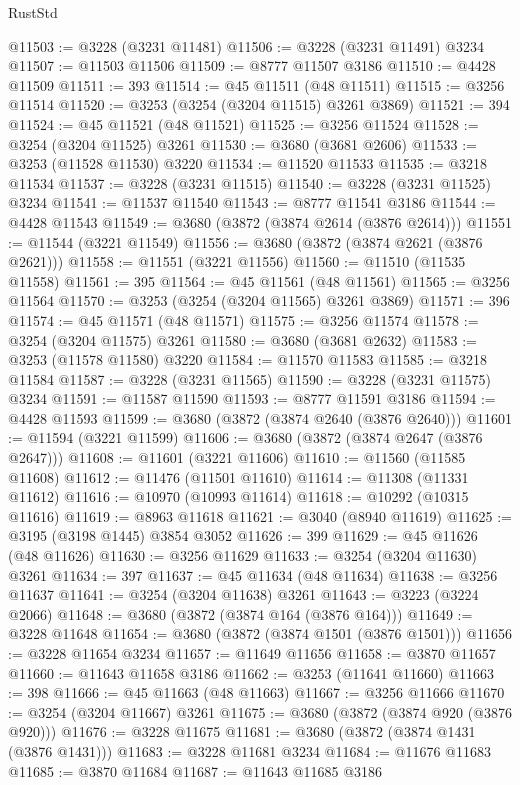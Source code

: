 \begin{lexlean}{RustStd}
\begin{coremodule}
{\begin{coremodule}
{{{{{{{{{{{{{{{{{{{{{{{{{{{{{{{{{{{{{@11503 := @3228 (@3231 @11481)
@11506 := @3228 (@3231 @11491) @3234
@11507 := @11503 @11506
@11509 := @8777 @11507 @3186
@11510 := @4428 @11509
@11511 := 393
@11514 := @45 @11511 (@48 @11511)
@11515 := @3256 @11514
@11520 := @3253 (@3254 (@3204 @11515) @3261 @3869)
@11521 := 394
@11524 := @45 @11521 (@48 @11521)
@11525 := @3256 @11524
@11528 := @3254 (@3204 @11525) @3261
@11530 := @3680 (@3681 @2606)
@11533 := @3253 (@11528 @11530) @3220
@11534 := @11520 @11533
@11535 := @3218 @11534
@11537 := @3228 (@3231 @11515)
@11540 := @3228 (@3231 @11525) @3234
@11541 := @11537 @11540
@11543 := @8777 @11541 @3186
@11544 := @4428 @11543
@11549 := @3680 (@3872 (@3874 @2614 (@3876 @2614)))
@11551 := @11544 (@3221 @11549)
@11556 := @3680 (@3872 (@3874 @2621 (@3876 @2621)))
@11558 := @11551 (@3221 @11556)
@11560 := @11510 (@11535 @11558)
@11561 := 395
@11564 := @45 @11561 (@48 @11561)
@11565 := @3256 @11564
@11570 := @3253 (@3254 (@3204 @11565) @3261 @3869)
@11571 := 396
@11574 := @45 @11571 (@48 @11571)
@11575 := @3256 @11574
@11578 := @3254 (@3204 @11575) @3261
@11580 := @3680 (@3681 @2632)
@11583 := @3253 (@11578 @11580) @3220
@11584 := @11570 @11583
@11585 := @3218 @11584
@11587 := @3228 (@3231 @11565)
@11590 := @3228 (@3231 @11575) @3234
@11591 := @11587 @11590
@11593 := @8777 @11591 @3186
@11594 := @4428 @11593
@11599 := @3680 (@3872 (@3874 @2640 (@3876 @2640)))
@11601 := @11594 (@3221 @11599)
@11606 := @3680 (@3872 (@3874 @2647 (@3876 @2647)))
@11608 := @11601 (@3221 @11606)
@11610 := @11560 (@11585 @11608)
@11612 := @11476 (@11501 @11610)
@11614 := @11308 (@11331 @11612)
@11616 := @10970 (@10993 @11614)
@11618 := @10292 (@10315 @11616)
@11619 := @8963 @11618
@11621 := @3040 (@8940 @11619)
@11625 := @3195 (@3198 @1445) @3854 @3052
@11626 := 399
@11629 := @45 @11626 (@48 @11626)
@11630 := @3256 @11629
@11633 := @3254 (@3204 @11630) @3261
@11634 := 397
@11637 := @45 @11634 (@48 @11634)
@11638 := @3256 @11637
@11641 := @3254 (@3204 @11638) @3261
@11643 := @3223 (@3224 @2066)
@11648 := @3680 (@3872 (@3874 @164 (@3876 @164)))
@11649 := @3228 @11648
@11654 := @3680 (@3872 (@3874 @1501 (@3876 @1501)))
@11656 := @3228 @11654 @3234
@11657 := @11649 @11656
@11658 := @3870 @11657
@11660 := @11643 @11658 @3186
@11662 := @3253 (@11641 @11660)
@11663 := 398
@11666 := @45 @11663 (@48 @11663)
@11667 := @3256 @11666
@11670 := @3254 (@3204 @11667) @3261
@11675 := @3680 (@3872 (@3874 @920 (@3876 @920)))
@11676 := @3228 @11675
@11681 := @3680 (@3872 (@3874 @1431 (@3876 @1431)))
@11683 := @3228 @11681 @3234
@11684 := @11676 @11683
@11685 := @3870 @11684
@11687 := @11643 @11685 @3186
}}}}}}}}}}}}}}}}}}}}}}}}}}}}}}}}}}}}}
\end{coremodule}}
\end{coremodule}
\end{lexlean}
